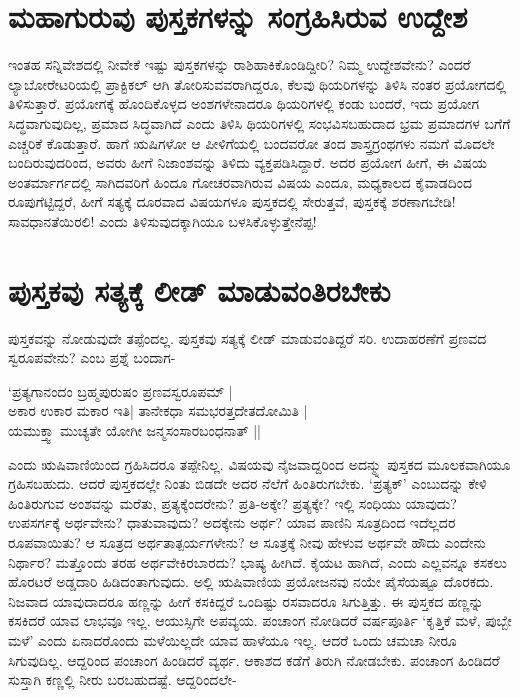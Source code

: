 \section*{ಮಹಾಗುರುವು ಪುಸ್ತಕಗಳನ್ನು ಸಂಗ್ರಹಿಸಿರುವ ಉದ್ದೇಶ}

ಇಂತಹ ಸನ್ನಿವೇಶದಲ್ಲಿ ನೀವೇಕೆ ಇಷ್ಟು ಪುಸ್ತಕಗಳನ್ನು ರಾಶಿಹಾಕಿಕೊಂಡಿದ್ದೀರಿ? ನಿಮ್ಮ ಉದ್ದೇಶವೇನು? ಎಂದರೆ ಲ್ಯಾಬೋರೇಟರಿಯಲ್ಲಿ ಪ್ರಾಕ್ಟಿಕಲ್  ಆಗಿ ತೋರಿಸುವವರಾಗಿದ್ದರೂ, ಕೆಲವು ಥಿಯರಿಗಳನ್ನು ತಿಳಿಸಿ ನಂತರ ಪ್ರಯೋಗದಲ್ಲಿ ತಿಳಿಸುತ್ತಾರೆ. ಪ್ರಯೋಗಕ್ಕೆ ಹೊಂದಿಕೊಳ್ಳದ ಅಂಶಗಳೇನಾದರೂ ಥಿಯರಿಗಳಲ್ಲಿ ಕಂಡು ಬಂದರೆ, ಇದು ಪ್ರಯೋಗ ಸಿದ್ಧವಾಗುವುದಿಲ್ಲ, ಪ್ರಮಾದ ಸಿದ್ಧವಾಗಿದೆ ಎಂದು ತಿಳಿಸಿ ಥಿಯರಿಗಳಲ್ಲಿ ಸಂಭವಿಸಬಹುದಾದ ಭ್ರಮ ಪ್ರಮಾದಗಳ ಬಗೆಗೆ ಎಚ್ಚರಿಕೆ ಕೊಡುತ್ತಾರೆ. ಹಾಗೆ ಋಷಿಗಳೋ ಆ ಪೀಳಿಗೆಯಲ್ಲಿ ಬಂದವರೋ ತಂದ ಶಾಸ್ತ್ರಗ್ರಂಥಗಳು ನಮಗೆ ಮೊದಲೇ ಬಂದಿರುವುದರಿಂದ, ಅವರು ಹೀಗೆ ನಿಜಾಂಶವನ್ನು ತಿಳಿದು ವ್ಯಕ್ತಪಡಿಸಿದ್ದಾರೆ. ಅದರ ಪ್ರಯೋಗ ಹೀಗೆ, ಈ ವಿಷಯ ಅಂತರ್ಮಾರ್ಗದಲ್ಲಿ ಸಾಗಿದವರಿಗೆ ಹಿಂದೂ ಗೋಚರವಾಗಿರುವ ವಿಷಯ ಎಂದೂ, ಮಧ್ಯಕಾಲದ ಕೈವಾಡದಿಂದ ರೂಪುಗೆಟ್ಟಿದ್ದರೆ, ಹೀಗೆ ಸತ್ಯಕ್ಕೆ ದೂರವಾದ ವಿಷಯಗಳೂ ಪುಸ್ತಕದಲ್ಲಿ ಸೇರುತ್ತವೆ, ಪುಸ್ತಕಕ್ಕೆ ಶರಣಾಗಬೇಡಿ! ಸಾವಧಾನತೆಯಿರಲಿ! ಎಂದು ತಿಳಿಸುವುದಕ್ಕಾಗಿಯೂ ಬಳಸಿಕೊಳ್ಳುತ್ತೇನೆಪ್ಪ!

\section*{ಪುಸ್ತಕವು ಸತ್ಯಕ್ಕೆ ಲೀಡ್ ಮಾಡುವಂತಿರಬೇಕು}

ಪುಸ್ತಕವನ್ನು ನೋಡುವುದೇ ತಪ್ಪೆಂದಲ್ಲ. ಪುಸ್ತಕವು ಸತ್ಯಕ್ಕೆ ಲೀಡ್ ಮಾಡುವಂತಿದ್ದರೆ ಸರಿ. ಉದಾಹರಣೆಗೆ ಪ್ರಣವದ ಸ್ವರೂಪವೇನು? ಎಂಬ ಪ್ರಶ್ನೆ ಬಂದಾಗ-

\begin{shloka}
`ಪ್ರತ್ಯಗಾನಂದಂ ಬ್ರಹ್ಮಪುರುಷಂ ಪ್ರಣವಸ್ವರೂಪಮ್ |\\
ಅಕಾರ ಉಕಾರ ಮಕಾರ ಇತಿ| ತಾನೇಕಧಾ ಸಮಭರತ್ತದೇತದೋಮಿತಿ |\\
ಯಮುಕ್ತ್ವಾ ಮುಚ್ಯತೇ ಯೋಗೀ ಜನ್ಮಸಂಸಾರಬಂಧನಾತ್ ||
\end{shloka}

ಎಂದು ಋಷಿವಾಣಿಯಿಂದ ಗ್ರಹಿಸಿದರೂ ತಪ್ಪೇನಿಲ್ಲ. ವಿಷಯವು ನೈಜವಾದ್ದರಿಂದ ಅದನ್ಮ್ನು ಪುಸ್ತಕದ ಮೂಲಕವಾಗಿಯೂ ಗ್ರಹಿಸಬಹುದು. ಆದರೆ ಪುಸ್ತಕದಲ್ಲೇ ನಿಂತು ಬಿಡದೇ ಅದರ ನೆಲೆಗೆ ಹಿಂತಿರುಗಬೇಕು. `ಪ್ರತ್ಯಕ್' ಎಂಬುದನ್ನು ಕೇಳಿ ಹಿಂತಿರುಗುವ ಅಂಶವನ್ನು ಮರೆತು, ಪ್ರತ್ಯಕ್ಕೆಂದರೇನು? ಪ್ರತಿ-ಅಕ್ಕೇ? ಪ್ರತ್ಯಕ್ಕೇ? ಇಲ್ಲಿ ಸಂಧಿಯು ಯಾವುದು? ಉಪಸರ್ಗಕ್ಕೆ ಅರ್ಥವೇನು? ಧಾತುವಾವುದು? ಅದಕ್ಕೇನು ಅರ್ಥ? ಯಾವ ಪಾಣಿನಿ ಸೂತ್ರದಿಂದ ಇದೆಲ್ಲದರ ರೂಪವಾಯಿತು? ಆ ಸೂತ್ರದ ಅರ್ಥತಾತ್ಪರ್ಯಗಳೇನು? ಆ ಸೂತ್ರಕ್ಕೆ ನೀವು ಹೇಳುವ ಅರ್ಥವೇ ಹೌದು ಎಂದೇನು ನಿರ್ಥಾರ? ಮತ್ತೊಂದು ತರಹ ಅರ್ಥವೇಕಿರಬಾರದು? ಭಾಷ್ಯ ಹೀಗಿದೆ. ಕೈಯಟ ಹಾಗಿದೆ, ಎಂದು ಎಲ್ಲವನ್ನೂ ಕಸಕಲು ಹೊರಟರೆ ಅಡ್ಡದಾರಿ ಹಿಡಿದಂತಾಗುವುದು. ಅಲ್ಲಿ ಋಷಿವಾಣಿಯ ಪ್ರಯೋಜನವು ನಯೇ ಪೈಸೆಯಷ್ಟೂ ದೊರಕದು. ನಿಜವಾದ ಯಾವುದಾದರೂ ಹಣ್ಣನ್ನು ಹೀಗೆ ಕಸಕಿದ್ದರೆ ಒಂದಿಷ್ಟು ರಸವಾದರೂ ಸಿಗುತ್ತಿತ್ತು. ಈ ಪುಸ್ತಕದ ಹಣ್ಣನ್ನು ಕಸಕಿದರೆ ಯಾವ ಲಾಭವೂ ಇಲ್ಲ. ಆಯುಸ್ಸಿಗೇ ಅಪವ್ಯಯ. ಪಂಚಾಂಗ ನೋಡಿದರೆ ವರ್ಷಪೂರ್ತಿ `ಕೃತ್ತಿಕೆ ಮಳೆ, ಪುಬ್ಬೇ ಮಳೆ' ಎಂದು ಏನಾದರೊಂದು ಮಳೆಯಿಲ್ಲದೇ ಯಾವ ಹಾಳೆಯೂ ಇಲ್ಲ. ಆದರೆ ಒಂದು ಚಮಚಾ ನೀರೂ ಸಿಗುವುದಿಲ್ಲ. ಆದ್ದರಿಂದ ಪಂಚಾಂಗ ಹಿಂಡಿದರೆ ವ್ಯರ್ಥ. ಆಕಾಶದ ಕಡೆಗೆ ತಿರುಗಿ ನೋಡಬೇಕು. ಪಂಚಾಂಗ ಹಿಂಡಿದರೆ ಸುಸ್ತಾಗಿ ಕಣ್ಣಲ್ಲಿ ನೀರು ಬರಬಹುದಷ್ಟೆ. ಆದ್ದರಿಂದಲೇ-


